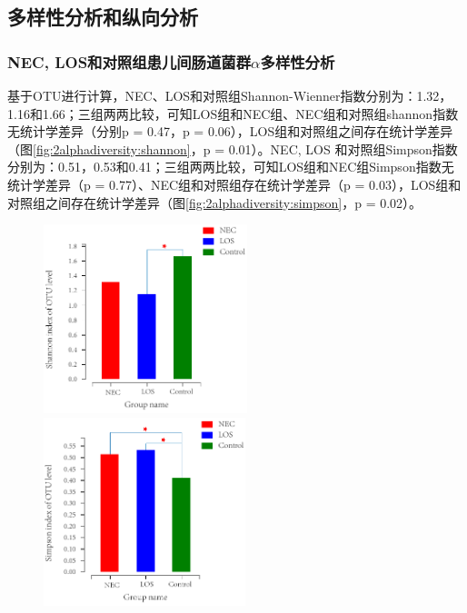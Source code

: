 {{  %
  \subsection{多样性分析和纵向分析}
    \subsubsection{NEC, LOS和对照组患儿间肠道菌群$\alpha$多样性分析}
      基于OTU进行计算，NEC、LOS和对照组Shannon-Wienner指数分别为：1.32，1.16和1.66；三组两两比较，可知LOS组和NEC组、NEC组和对照组shannon指数无统计学差异（分别p = 0.47，p = 0.06），LOS组和对照组之间存在统计学差异（图\ref{fig:2alphadiversity:shannon}，p = 0.01）。NEC, LOS 和对照组Simpson指数分别为：0.51，0.53和0.41；三组两两比较，可知LOS组和NEC组Simpson指数无统计学差异（p = 0.77）、NEC组和对照组存在统计学差异（p = 0.03），LOS组和对照组之间存在统计学差异（图\ref{fig:2alphadiversity:simpson}，p = 0.02）。
      \begin{figure}[!htp]
        \centering
            {\includegraphics[height=5.5cm]{figure/2shannon.pdf}}
            \hspace{4em}
            {\includegraphics[height=5.5cm]{figure/2simpson.pdf}}
        \label{fig:2alphadiversity}
      \end{figure}
}}

